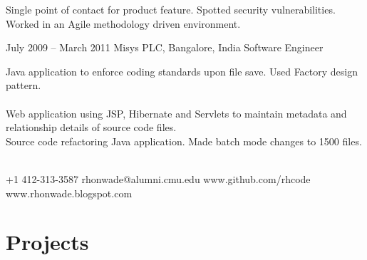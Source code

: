 \documentclass{tccv}
\begin{document}
\begin{eventlist}
Single point of contact for product feature. Spotted security vulnerabilities. Worked in an Agile methodology driven environment.

\item{July 2009 -- March 2011}
     {Misys PLC, Bangalore, India}
     {Software Engineer}

Java application to enforce coding standards upon file save. Used Factory design pattern.\\
\\

Web application using JSP, Hibernate and Servlets to maintain metadata and relationship details of source code files.\\

Source code refactoring Java application. Made batch mode changes to 1500 files.\\
\\
\end{eventlist}



    {+1 412-313-3587}
    {rhonwade@alumni.cmu.edu}
    {www.github.com/rhcode}
    {www.rhonwade.blogspot.com}

\section{Projects}
\end{document}
